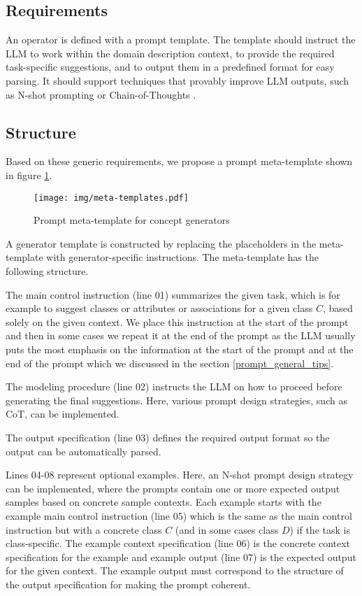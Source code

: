 \subsection{Requirements}

An operator is defined with a prompt template. The template should instruct
the LLM to work within the domain description context, to provide the required
task-specific suggestions, and to output them in a predefined format for easy
parsing. It should support techniques that provably improve LLM outputs, such
as N-shot prompting \cite{Brown2020} or Chain-of-Thoughts \cite{Wei2022}.


\subsection{Structure}

Based on these generic requirements, we propose a prompt meta-template shown in figure \ref{fig:meta-templates}.

\begin{figure}[!h]
    \centering
    \texttt{[image: img/meta-templates.pdf]}
    \caption{\centering Prompt meta-template for concept generators}
    \label{fig:meta-templates}
\end{figure}

A generator template is constructed by replacing the placeholders in the meta-template with generator-specific instructions. The meta-template has the following structure.

The main control instruction (line 01) summarizes the given task, which is for example to suggest classes or attributes or associations for a given class $C$, based solely on the given context. We place this instruction at the start of the prompt and then in some cases we repeat it at the end of the prompt as the LLM usually puts the most emphasis on the information at the start of the prompt and at the end of the prompt which we discussed in the section \ref{prompt_general_tips}.

The modeling procedure (line 02) instructs the LLM on how to proceed before generating the final suggestions. Here, various prompt design strategies, such as CoT, can be implemented.

The output specification (line 03) defines the required output format so the output can be automatically parsed.

Lines 04-08 represent optional examples. Here, an N-shot prompt design strategy can be implemented, where the prompts contain one or more expected output samples based on concrete sample contexts. Each example starts with the example main control instruction (line 05) which is the same as the main control instruction but with a concrete class $C$ (and in some cases class $D$) if the task is class-specific. The example context specification (line 06) is the concrete context specification for the example and example output (line 07) is the expected output for the given context. The example output must correspond to the structure of the output specification for making the prompt coherent.

